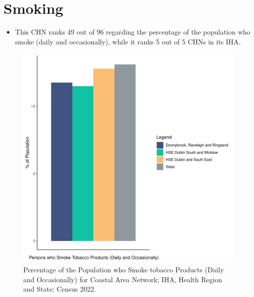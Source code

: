 \documentclass{article}
\begin{document}
\pagebreak

\section{Smoking}\label{sect:Smoking}
\begin{itemize}
\item This CHN ranks  49 out of 96 regarding the percentage of the population who smoke (daily and occasionally), while it ranks   5 out of 5 CHNs in its IHA.
\end{itemize}
\begin{figure}[H]
	\centering
	\includegraphics[width = 120mm]{../figures/SmokingED.pdf}
	\caption{Percentage of the Population who Smoke tobacco Products (Daily and Occasionally) for Coastal Area Network; IHA, Health Region and State; Census 2022.}
	\label{fig:2ae19629-1a6a-13a3-e055-000000000001}
	\end{figure}
	
\end{document}
